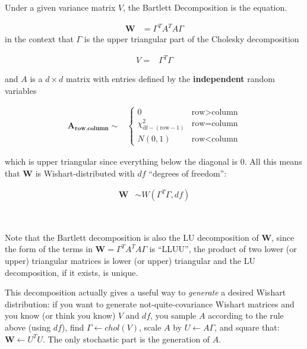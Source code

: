 \documentclass[english]{report}
\begin{document}




Under a given variance matrix $V$, the Bartlett Decomposition is
the equation.

\begin{align*}
\mathbf{W} & =\Gamma^{T}A^{T}A\Gamma
\end{align*}
in the context that $\Gamma$ is the upper triangular part of the
Cholesky decomposition

\begin{align*}
V= & \Gamma^{T}\Gamma
\end{align*}


and $A$ is a $d\times d$ matrix with entries defined by the \textbf{independent
}random variables

\begin{align*}
\mathbf{A_{\text{row},\text{column}}}\sim & \begin{cases}
0 & \text{row}>\text{column}\\
\chi_{\text{df}-(\text{row}-1)}^{2} & \text{row}=\text{column}\\
N(0,1) & \text{row}<\text{column}
\end{cases}
\end{align*}


which is upper triangular since everything below the diagonal is 0.
All this means that  $\mathbf{W}$ is Wishart-distributed with $df$
``degrees of freedom'':

\begin{align*}
\mathbf{W} & \sim W(\Gamma^{T}\Gamma,df)
\end{align*}


~

Note that the Bartlett decomposition is also the LU decomposition
of $\mathbf{W}$, since the form of the terms in $\mathbf{W}=\Gamma^{T}A^{T}A\Gamma$
is ``LLUU'', the product of two lower (or upper) triangular matrices
is lower (or upper) triangular and the LU decomposition, if it exists,
is unique.


This decomposition actually gives a useful way to \emph{generate }a
desired Wishart distribution: if you want to generate not-quite-covariance
Wishart matrices and you know (or think you know) $V$ and $df$,
you sample $A$ according to the rule above (using $df$), find $\Gamma\leftarrow chol(V)$,
scale $A$ by $U\leftarrow A\Gamma$, and square that: $\mathbf{W}\leftarrow U^{T}U$.
The only stochastic part is the generation of $A$.
\end{document}
